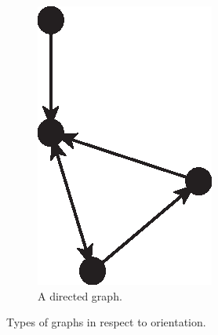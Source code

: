 \begin{figure}[H]
\begin{subfigure}[b]{0.25\textwidth}
            \label{fig:graphs_orientation_undirected}
          \end{subfigure}
          \qquad\qquad\qquad
          \begin{subfigure}[b]{0.25\textwidth}
            \includegraphics[width=\textwidth]{chapters/02_problem_definition/graph_directed}
            \caption{A directed graph.}
            \label{fig:graphs_orientation_directed}
          \end{subfigure}
        \caption{Types of graphs in respect to orientation.}
        \label{fig:graphs_orientation}
      \end{figure}
      
